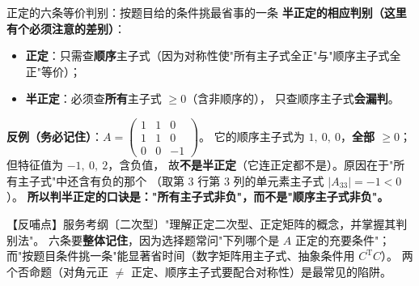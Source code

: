 \begin{fdeep}{正定的六条等价判别：按题目给的条件挑最省事的一条}
\textbf{半正定的相应判别（这里有个必须注意的差别）}：
\begin{itemize}[leftmargin=2.2em,itemsep=0.22em]
\item \textbf{正定}：只需查\textbf{顺序}主子式（因为对称性使"所有主子式全正"与"顺序主子式全正"等价）；
\item \textbf{半正定}：必须查\textbf{所有}主子式 $\ge0$（含非顺序的），
      只查顺序主子式\textbf{会漏判}。
\end{itemize}
\textbf{反例（务必记住）}：$A=\begin{pmatrix}1&1&0\\1&1&0\\0&0&-1\end{pmatrix}$。
它的顺序主子式为 $1,\ 0,\ 0$，\textbf{全部 $\ge0$}；但特征值为 $-1,\ 0,\ 2$，含负值，
故\textbf{不是半正定}（它连正定都不是）。原因在于"所有主子式"中还含有负的那个
（取第 3 行第 3 列的单元素主子式 $\lvert A_{33}\rvert=-1<0$）。
\textbf{所以判半正定的口诀是："所有主子式非负"，而不是"顺序主子式非负"。}

【反哺点】服务考纲〔二次型〕"理解正定二次型、正定矩阵的概念，并掌握其判别法"。
六条要\textbf{整体记住}，因为选择题常问"下列哪个是 $A$ 正定的充要条件"；
而"按题目条件挑一条"能显著省时间（数字矩阵用主子式、抽象条件用 $C^{\mathrm T}C$）。
两个否命题（对角元正 $\ne$ 正定、顺序主子式要配合对称性）是最常见的陷阱。
\end{fdeep}

